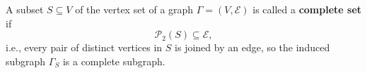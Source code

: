 A subset $S \subseteq V$ of the vertex set of a graph $\Gamma = (V, \mathcal{E})$ is called a \textbf{complete set} if
$$\mathcal{P}_2(S) \subseteq \mathcal{E},$$
i.e., every pair of distinct vertices in $S$ is joined by an edge, so the induced subgraph $\Gamma_S$ is a complete subgraph.
